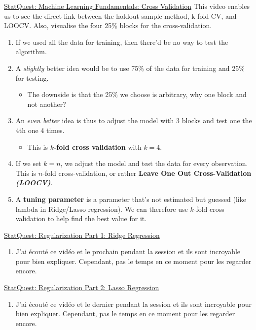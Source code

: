 \documentclass[12pt, titlepage, french]{report}
\begin{document}
\begin{YTB_SUMM}{\href{https://www.youtube.com/watch?v=fSytzGwwBVw}{StatQuest: Machine Learning Fundamentals: Cross Validation}}
This video enables us to see the direct link between the holdout sample method, k-fold CV, and LOOCV. Also, visualise the four 25\% blocks for the cross-validation.
\begin{enumerate}
	\item	If we used all the data for training, then there'd be no way to test the algorithm.
	\item	A \textit{slightly} better idea would be to use 75\% of the data for training and 25\% for testing.
	\begin{itemize}
		\item	The downside is that the 25\% we choose is arbitrary, why one block and not another?
	\end{itemize}
	\item	An \textit{even better} idea is thus to adjust the model with 3 blocks and test one the 4th one 4 times. 
	\begin{itemize}
		\item	This is \textbf{$k$-fold cross validation} with $k = 4$.
	\end{itemize}
	\item	If we set $k = n$, we adjust the model and test the data for every observation. This is $n$-fold cross-validation, or rather \textbf{Leave One Out Cross-Validation \textit{(LOOCV)}}.
	\item	A \textbf{tuning parameter} is a parameter that's not estimated but guessed (like lambda in Ridge/Lasso regression). We can therefore use $k$-fold cross validation to help find the best value for it.
\end{enumerate}
\end{YTB_SUMM}

\begin{YTB_SUMM}{\href{https://www.youtube.com/watch?v=Q81RR3yKn30&list=PLblh5JKOoLUICTaGLRoHQDuF_7q2GfuJF}{StatQuest: Regularization Part 1: Ridge Regression}}
\begin{enumerate}
	\item	J'ai écouté ce vidéo et le prochain pendant la session et ils sont incroyable pour bien expliquer. Cependant, pas le temps en ce moment pour les regarder encore.
\end{enumerate}
\end{YTB_SUMM}

\begin{YTB_SUMM}{\href{https://www.youtube.com/watch?v=NGf0voTMlcs&list=PLblh5JKOoLUICTaGLRoHQDuF_7q2GfuJF}{StatQuest: Regularization Part 2: Lasso Regression}}
\begin{enumerate}
	\item	J'ai écouté ce vidéo et le dernier pendant la session et ils sont incroyable pour bien expliquer. Cependant, pas le temps en ce moment pour les regarder encore.
\end{enumerate}
\end{YTB_SUMM}
\end{document}
